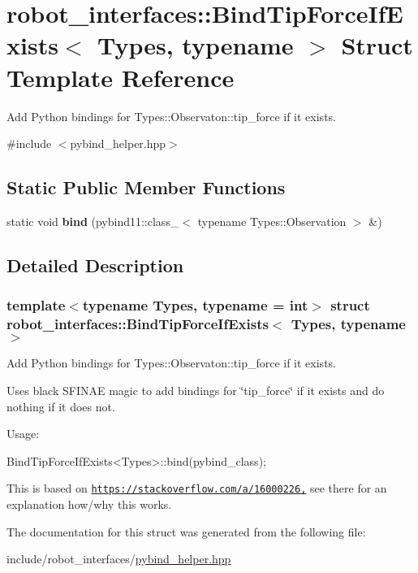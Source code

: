 \hypertarget{structrobot__interfaces_1_1BindTipForceIfExists}{}\section{robot\+\_\+interfaces\+:\+:Bind\+Tip\+Force\+If\+Exists$<$ Types, typename $>$ Struct Template Reference}
\label{structrobot__interfaces_1_1BindTipForceIfExists}


Add Python bindings for Types\+::\+Observaton\+::tip\+\_\+force if it exists.  




{\ttfamily \#include $<$pybind\+\_\+helper.\+hpp$>$}

\subsection*{Static Public Member Functions}
\begin{DoxyCompactItemize}
\item 
\mbox{\label{structrobot__interfaces_1_1BindTipForceIfExists_afe8c5407b1bd9e78272173ae51ff5cc7}} 
static void {\bfseries bind} (pybind11\+::class\+\_\+$<$ typename Types\+::\+Observation $>$ \&)
\end{DoxyCompactItemize}


\subsection{Detailed Description}
\subsubsection*{template$<$typename Types, typename = int$>$\newline
struct robot\+\_\+interfaces\+::\+Bind\+Tip\+Force\+If\+Exists$<$ Types, typename $>$}

Add Python bindings for Types\+::\+Observaton\+::tip\+\_\+force if it exists. 

Uses black S\+F\+I\+N\+AE magic to add bindings for \char`\"{}tip\+\_\+force\char`\"{} if it exists and do nothing if it does not.

Usage\+: \begin{DoxyVerb}BindTipForceIfExists<Types>::bind(pybind_class);
\end{DoxyVerb}


This is based on \href{https://stackoverflow.com/a/16000226,}{\tt https\+://stackoverflow.\+com/a/16000226,} see there for an explanation how/why this works. 

The documentation for this struct was generated from the following file\+:\begin{DoxyCompactItemize}
\item 
include/robot\+\_\+interfaces/\hyperlink{pybind__helper_8hpp}{pybind\+\_\+helper.\+hpp}\end{DoxyCompactItemize}
